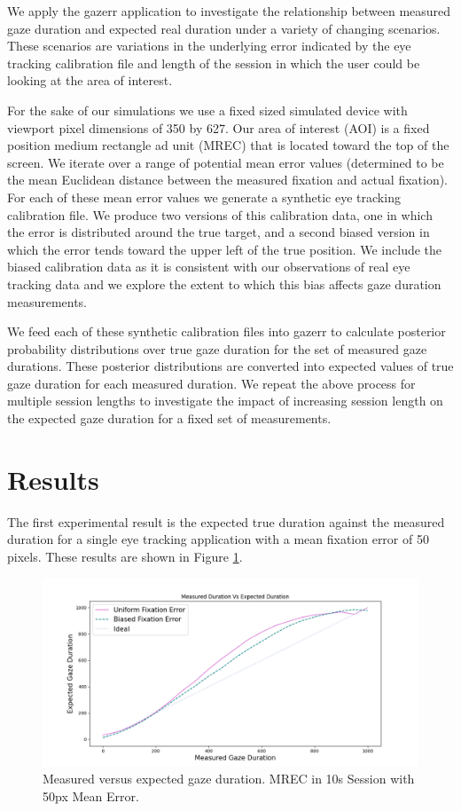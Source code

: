 \documentclass[12pt,a4paper]{article}
\numberwithin{equation}{section}
\begin{document}
We apply the gazerr application to investigate the relationship between measured gaze duration
and expected real duration under a variety of changing scenarios. These scenarios are variations
in the underlying error indicated by the eye tracking calibration file and length of the session
in which the user could be looking at the area of interest.

For the sake of our simulations we use a fixed sized simulated device with viewport pixel 
dimensions of 350 by 627. Our area of interest (AOI) is a fixed position medium rectangle ad unit (MREC)
that is located toward the top of the screen. We iterate over a range of potential mean error
values (determined to be the mean Euclidean distance between the measured fixation and actual fixation).
For each of these mean error values we generate a synthetic eye tracking calibration file. We produce
two versions of this calibration data, one in which the error is distributed around the true target,
and a second biased version in which the error tends toward the upper left of the true position. We 
include the biased calibration data as it is consistent with our observations of real eye tracking data
and we explore the extent to which this bias affects gaze duration measurements.

We feed each of these synthetic calibration files into gazerr to calculate posterior probability
distributions over true gaze duration for the set of measured gaze durations. These posterior
distributions are converted into expected values of true gaze duration for each measured duration.
We repeat the above process for multiple session lengths to investigate the impact of increasing
session length on the expected gaze duration for a fixed set of measurements.

\section{Results}

The first experimental result is the expected true duration against the measured duration
for a single eye tracking application with a mean fixation error of 50 pixels. These
results are shown in Figure \ref{fig:measured_vs_expected}.

\begin{figure}[h!]
\includegraphics[scale=0.5]{../results/Measured_vs_expected.png}
\caption{Measured versus expected gaze duration. MREC in 10s Session with 50px Mean Error.}
\label{fig:measured_vs_expected}
\end{figure}
\end{document}
